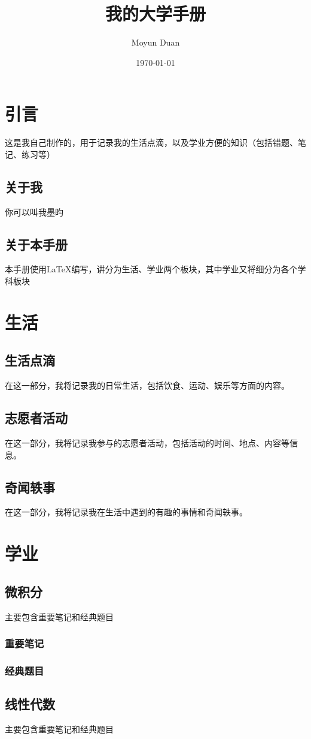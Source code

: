 \documentclass{book}
\title{我的大学手册}
\author{Moyun Duan}
\date{\today}
\begin{document}
\maketitle
\tableofcontents
\chapter{引言}
这是我自己制作的，用于记录我的生活点滴，以及学业方便的知识（包括错题、笔记、练习等）
\section{关于我}
你可以叫我墨昀
\section{关于本手册}
本手册使用\LaTeX{}编写，讲分为生活、学业两个板块，其中学业又将细分为各个学科板块
\chapter{生活}
\section{生活点滴}
在这一部分，我将记录我的日常生活，包括饮食、运动、娱乐等方面的内容。
\section{志愿者活动}
在这一部分，我将记录我参与的志愿者活动，包括活动的时间、地点、内容等信息。
\section{奇闻轶事}
在这一部分，我将记录我在生活中遇到的有趣的事情和奇闻轶事。
\chapter{学业}
\section{微积分}
主要包含重要笔记和经典题目
\subsection{重要笔记}
\subsection{经典题目}
\section{线性代数}
主要包含重要笔记和经典题目
\end{document}
